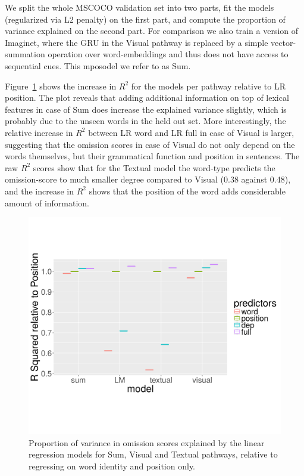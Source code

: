 \noindent We split the whole MSCOCO validation set into two parts, fit the 
models (regularized via L2 penalty) on the first part, and compute the 
proportion of variance explained on the second part. 
For comparison we also train a version of {\sc Imaginet},
where the GRU in the {\sc Visual} pathway is replaced by a simple vector-summation operation
over word-embeddings and thus does not have access to sequential cues. This
mposodel we refer to as {\sc Sum}. 

Figure~\ref{fig:rsquared} shows the increase in $R^2$  for the models 
per pathway relative to {\sc LR position}. The plot reveals that 
adding additional information on top of lexical features in case of {\sc Sum} 
does increase the explained variance slightly, which is probably due to 
the unseen words in the held out set. More interestingly, the
relative increase in $R^2$ between {\sc LR word} and {\sc LR full} in
case of {\sc Visual} is larger, suggesting that 
the omission scores in case of {\sc Visual} do not only depend on the words themselves,
but their grammatical function and position in sentences.  The raw  $R^2$
scores show that for the {\sc Textual} model the word-type predicts the omission-score
to much smaller degree compared to {\sc Visual} (0.38 against 0.48), and the 
increase in $R^2$ shows that the position of the word adds considerable 
amount of information. 

\begin{figure}
\centering
  \includegraphics[scale=0.35]{position-new.png}
\caption{Proportion of variance in omission scores explained by the
  linear regression models
 for {\sc Sum}, {\sc Visual} and {\sc Textual} pathways, relative to
 regressing on word identity and position only. }
\label{fig:rsquared}
\end{figure}


